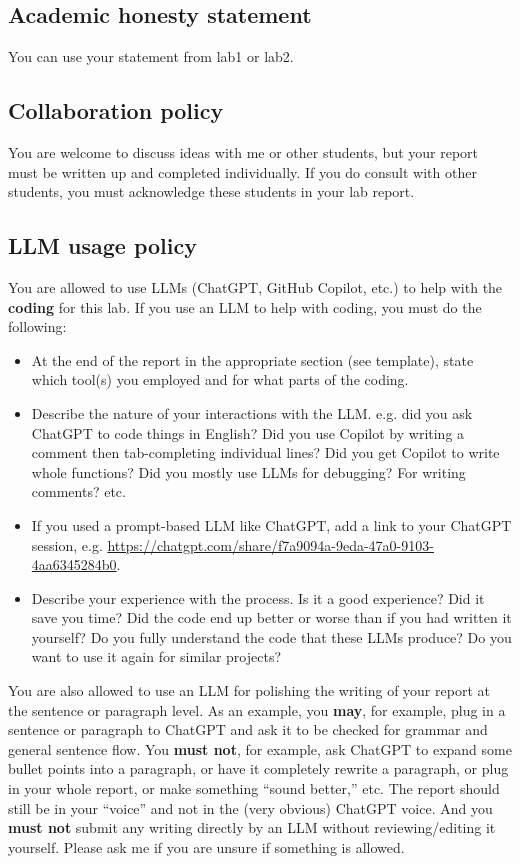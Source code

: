 \documentclass[letterpaper,12pt]{article}
\begin{document}
\subsection{Academic honesty statement}

You can use your statement from lab1 or lab2.

\subsection{Collaboration policy}

You are welcome to discuss ideas with me or other students, but your report must be written up and completed individually. If you do consult with other students, you must acknowledge these students in your lab report.

\subsection{LLM usage policy}

You are allowed to use LLMs (ChatGPT, GitHub Copilot, etc.) to help with the \textbf{coding} for this lab.  If you use an LLM to help with coding, you must do the following:
\begin{itemize}
    \item At the end of the report in the appropriate section (see template), state which tool(s) you employed and for what parts of the coding.
    \item Describe the nature of your interactions with the LLM. e.g. did you ask ChatGPT to code things in English? Did you use Copilot by writing a comment then tab-completing individual lines? Did you get Copilot to write whole functions? Did you mostly use LLMs for debugging? For writing comments? etc.
    \item If you used a prompt-based LLM like ChatGPT, add a link to your ChatGPT session, e.g. \url{https://chatgpt.com/share/f7a9094a-9eda-47a0-9103-4aa6345284b0}.
    \item Describe your experience with the process. Is it a good experience? Did it save you time? Did the code end up better or worse than if you had written it yourself? Do you fully understand the code that these LLMs produce? Do you want to use it again for similar projects?
\end{itemize}

You are also allowed to use an LLM for polishing the writing of your report at the sentence or paragraph level. As an example, you \textbf{may}, for example, plug in a sentence or paragraph to ChatGPT and ask it to be checked for grammar and general sentence flow. You \textbf{must not}, for example, ask ChatGPT to expand some bullet points into a paragraph, or have it completely rewrite a paragraph, or plug in your whole report, or make something ``sound better,'' etc. The report should still be in your ``voice'' and not in the (very obvious) ChatGPT voice. And you \textbf{must not} submit any writing directly by an LLM without reviewing/editing it yourself. Please ask me if you are unsure if something is allowed.
\end{document}

